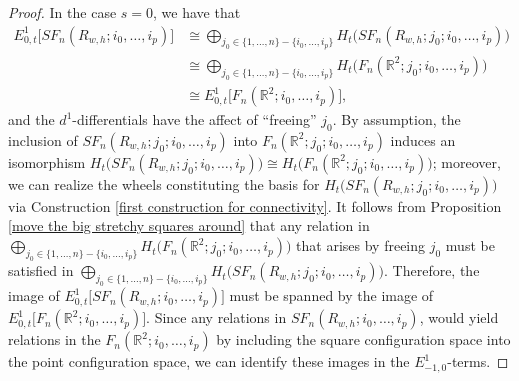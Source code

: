 \documentclass[pagebackref,colorlinks,citecolor=blue,linkcolor=blue,urlcolor=blue,filecolor=blue]{article}
\theoremstyle{definition}\newtheorem{definition}[thm]{Definition}
\theoremstyle{definition}
\newcommand{\R}{\ensuremath{\mathbb{R}}}
\begin{document}
\begin{proof}
In the case $s=0$, we have that
\begin{align*}
E^{1}_{0,t}\big[SF_{n}(R_{w,h};i_{0}, \dots, i_{p})\big]&\cong\bigoplus_{j_{0}\in \{1,\dots, n\}-\{i_{0}, \dots, i_{p}\}} H_{t}\big(SF_{n}(R_{w, h}; j_{0}; i_{0}, \dots, i_{p})\big)\\
&\cong \bigoplus_{j_{0}\in \{1,\dots, n\}-\{i_{0}, \dots, i_{p}\}} H_{t}\big(F_{n}(\R^{2}; j_{0}; i_{0}, \dots, i_{p})\big)\\
&\cong E^{1}_{0,t}\big[F_{n}(\R^{2};i_{0}, \dots, i_{p})\big],
\end{align*}
and the $d^{1}$-differentials have the affect of ``freeing'' $j_{0}$. 
By assumption, the inclusion of $SF_{n}(R_{w, h}; j_{0}; i_{0}, \dots, i_{p})$ into $F_{n}(\R^{2}; j_{0}; i_{0}, \dots, i_{p})$ induces an isomorphism $H_{t}\big(SF_{n}(R_{w, h}; j_{0}; i_{0}, \dots, i_{p})\big)\cong H_{t}\big(F_{n}(\R^{2}; j_{0}; i_{0}, \dots, i_{p})\big)$; moreover, we can realize the wheels constituting the basis for $H_{t}\big(SF_{n}(R_{w, h}; j_{0}; i_{0}, \dots, i_{p})\big)$ via Construction \ref{first construction for connectivity}.  
It follows from Proposition \ref{move the big stretchy squares around} that any relation in $\bigoplus_{j_{0}\in \{1,\dots, n\}-\{i_{0}, \dots, i_{p}\}} H_{t}\big(F_{n}(\R^{2}; j_{0}; i_{0}, \dots, i_{p})\big)$ that arises by freeing $j_{0}$  must be satisfied in $\bigoplus_{j_{0}\in \{1,\dots, n\}-\{i_{0}, \dots, i_{p}\}} H_{t}\big(SF_{n}(R_{w, h}; j_{0}; i_{0}, \dots, i_{p})\big)$.
Therefore, the image of $E^{1}_{0,t}\big[SF_{n}(R_{w,h};i_{0}, \dots, i_{p})\big]$ must be spanned by the image of $E^{1}_{0,t}\big[F_{n}(\R^{2};i_{0}, \dots, i_{p})\big]$.
Since any relations in $SF_{n}(R_{w,h};i_{0}, \dots, i_{p})$, would yield relations in the $F_{n}(\R^{2};i_{0}, \dots, i_{p})$ by including the square configuration space into the point configuration space, we can identify these images in the $E^{1}_{-1, 0}$-terms.


\end{proof}
\end{document}
